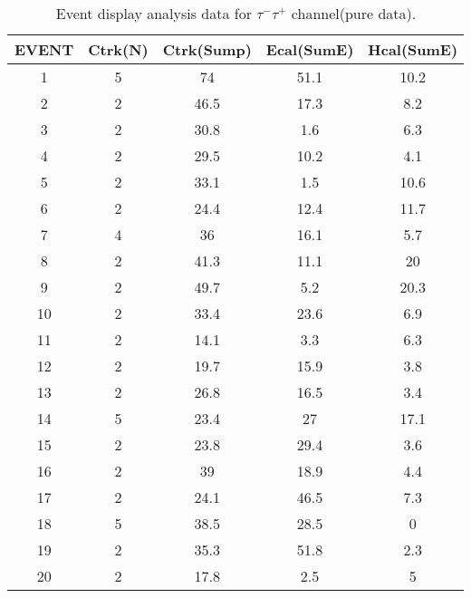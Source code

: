 \begin{table}[h!]
    \centering
    \caption{Event display analysis data for $\tau^-\tau^+$ channel(pure data).}
    \begin{tabular}{ccccc}
    \hline
    EVENT & Ctrk(N) & Ctrk(Sump) & Ecal(SumE) & Hcal(SumE) \\ \hline
    1     & 5       & 74         & 51.1       & 10.2       \\
    2     & 2       & 46.5       & 17.3       & 8.2        \\
    3     & 2       & 30.8       & 1.6        & 6.3        \\
    4     & 2       & 29.5       & 10.2       & 4.1        \\
    5     & 2       & 33.1       & 1.5        & 10.6       \\
    6     & 2       & 24.4       & 12.4       & 11.7       \\
    7     & 4       & 36         & 16.1       & 5.7        \\
    8     & 2       & 41.3       & 11.1       & 20         \\
    9     & 2       & 49.7       & 5.2        & 20.3       \\
    10    & 2       & 33.4       & 23.6       & 6.9        \\
    11    & 2       & 14.1       & 3.3        & 6.3        \\
    12    & 2       & 19.7       & 15.9       & 3.8        \\
    13    & 2       & 26.8       & 16.5       & 3.4        \\
    14    & 5       & 23.4       & 27         & 17.1       \\
    15    & 2       & 23.8       & 29.4       & 3.6        \\
    16    & 2       & 39         & 18.9       & 4.4        \\
    17    & 2       & 24.1       & 46.5       & 7.3        \\
    18    & 5       & 38.5       & 28.5       & 0          \\
    19    & 2       & 35.3       & 51.8       & 2.3        \\
    20    & 2       & 17.8       & 2.5        & 5         \\ \hline
    \end{tabular}
    \label{table:ed-tt}
\end{table}
    
